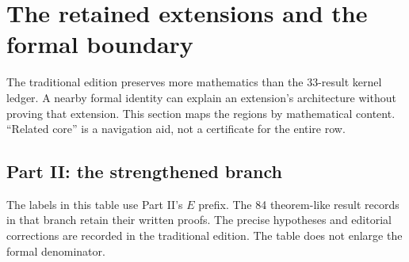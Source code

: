 \clearpage\section{The retained extensions and the formal boundary}
\label{sec:extensions}
The traditional edition preserves more mathematics than the 33-result kernel ledger. A nearby formal identity can explain an extension's architecture without proving that extension. This section maps the regions by mathematical content. ``Related core'' is a navigation aid, not a certificate for the entire row.

\subsection{Part II: the strengthened branch}
The labels in this table use Part II's $E$ prefix. The 84 theorem-like result records in that branch retain their written proofs. The precise hypotheses and editorial corrections are recorded in the traditional edition. The table does not enlarge the formal denominator.
